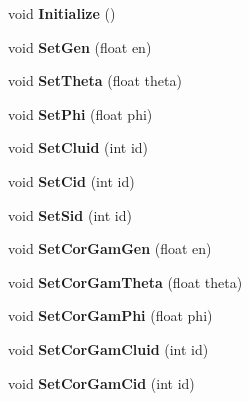 \begin{DoxyCompactItemize}
\item 
\mbox{\label{classmbevts_af4d8c772143ea8de192f6b2a2b344619}} 
void {\bfseries Initialize} ()
\item 
\mbox{\label{classmbevts_ad29cd681805c81fa079606dc50660f5a}} 
void {\bfseries Set\+Gen} (float en)
\item 
\mbox{\label{classmbevts_ab4730072411283cab109739a79f6c1ad}} 
void {\bfseries Set\+Theta} (float theta)
\item 
\mbox{\label{classmbevts_a7d94f91e2f6843abb701bf3c70341c8a}} 
void {\bfseries Set\+Phi} (float phi)
\item 
\mbox{\label{classmbevts_a599ac04245c6c4d92312756c629701ec}} 
void {\bfseries Set\+Cluid} (int id)
\item 
\mbox{\label{classmbevts_a7316bdb2d5d95d678a80760acccf8e9b}} 
void {\bfseries Set\+Cid} (int id)
\item 
\mbox{\label{classmbevts_a0fddb9db5add0514b2fca3785aafccbc}} 
void {\bfseries Set\+Sid} (int id)
\item 
\mbox{\label{classmbevts_aec472130dcb49b23b67fd33502169ce4}} 
void {\bfseries Set\+Cor\+Gam\+Gen} (float en)
\item 
\mbox{\label{classmbevts_ab373117c8febf8133be23059f33c0d96}} 
void {\bfseries Set\+Cor\+Gam\+Theta} (float theta)
\item 
\mbox{\label{classmbevts_a0a51dd0938ca775981cfbc28f5a89c9d}} 
void {\bfseries Set\+Cor\+Gam\+Phi} (float phi)
\item 
\mbox{\label{classmbevts_aef729d6b8949fabf8d2f046de428932e}} 
void {\bfseries Set\+Cor\+Gam\+Cluid} (int id)
\item 
\mbox{\label{classmbevts_ad225b203c9ced65bf3560027da64386f}} 
void {\bfseries Set\+Cor\+Gam\+Cid} (int id)
\item 

\end{DoxyCompactItemize}
